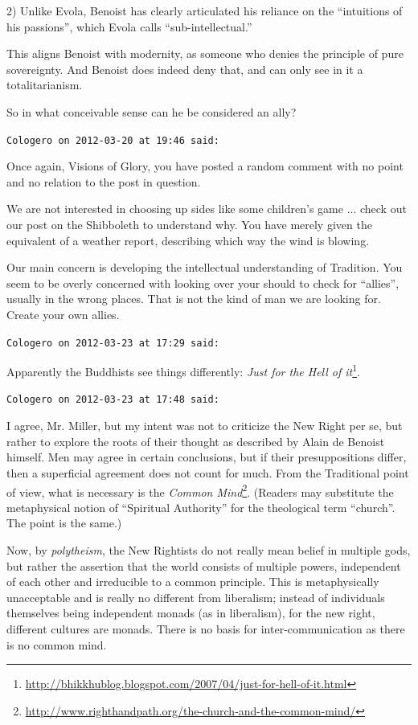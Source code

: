 \begin{footnotesize}
\begin{sffamily}
2) Unlike Evola, Benoist has clearly articulated his reliance on the ``intuitions of his passions'', which Evola calls ``sub-intellectual.''

This aligns Benoist with modernity, as someone who denies the principle of pure sovereignty. And Benoist does indeed deny that, and can only see in it a totalitarianism.

So in what conceivable sense can he be considered an ally?

\hfill

\texttt{Cologero on 2012-03-20 at 19:46 said:}

Once again, Visions of Glory, you have posted a random comment with no point and no relation to the post in question.

We are not interested in choosing up sides like some children's game ... check out our post on the Shibboleth to understand why. You have merely given the equivalent of a weather report, describing which way the wind is blowing.

Our main concern is developing the intellectual understanding of Tradition. You seem to be overly concerned with looking over your should to check for ``allies'', usually in the wrong places. That is not the kind of man we are looking for. Create your own allies.

\hfill

\texttt{Cologero on 2012-03-23 at 17:29 said:}

Apparently the Buddhists see things differently: \textit{Just for the Hell of it}\footnote{\url{http://bhikkhublog.blogspot.com/2007/04/just-for-hell-of-it.html}}.

\hfill

\texttt{Cologero on 2012-03-23 at 17:48 said:}

I agree, Mr. Miller, but my intent was not to criticize the New Right per se, but rather to explore the roots of their thought as described by Alain de Benoist himself. Men may agree in certain conclusions, but if their presuppositions differ, then a superficial agreement does not count for much. From the Traditional point of view, what is necessary is the \textit{Common Mind}\footnote{\url{http://www.righthandpath.org/the-church-and-the-common-mind/}}. (Readers may substitute the metaphysical notion of ``Spiritual Authority'' for the theological term ``church''. The point is the same.)

Now, by \emph{polytheism}, the New Rightists do not really mean belief in multiple gods, but rather the assertion that the world consists of multiple powers, independent of each other and irreducible to a common principle. This is metaphysically unacceptable and is really no different from liberalism; instead of individuals themselves being independent monads (as in liberalism), for the new right, different cultures are monads. There is no basis for inter-communication as there is no common mind.


\end{sffamily}
\end{footnotesize}
